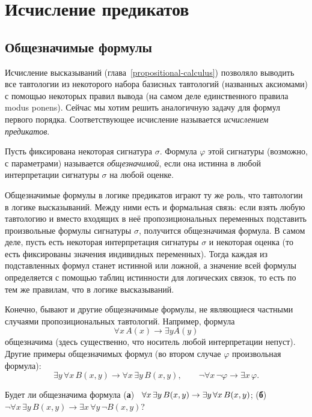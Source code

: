 \chapter{Исчисление предикатов}

\section{Общезначимые формулы}

Исчисление высказываний (глава~\ref{propositional-calculus})
позволяло выводить все тавтологии из некоторого набора базисных
тавтологий (названных аксиомами) с помощью некоторых правил
вывода (на самом деле единственного правила mo\-dus ponens).
Сейчас мы хотим решить аналогичную задачу для формул первого
порядка. Соответствующее исчисление называется
\emph{исчислением предикатов}.%

Пусть фиксирована некоторая сигнатура $\sigma$.
Формула $\varphi$ этой сигнатуры (возможно, с параметрами)
называется \emph{общезначимой},%
%
если она
истинна в любой интерпретации сигнатуры $\sigma$ на любой
оценке.

Общезначимые формулы в логике предикатов играют ту же роль, что
тавтологии в логике высказываний. Между ними есть и формальная
связь: если взять любую тавтологию и вместо входящих в неё
пропозициональных переменных подставить произвольные формулы
сигнатуры $\sigma$, получится общезначимая формула. В самом
деле, пусть есть некоторая интерпретация сигнатуры $\sigma$ и
некоторая оценка (то есть фиксированы значения индивидных
переменных). Тогда каждая из подставленных формул станет
истинной или ложной, а значение всей формулы определяется с
помощью таблиц истинности для логических связок, то есть по тем
же правилам, что в логике высказываний.

Конечно, бывают и другие общезначимые формулы, не являющиеся
частными случаями пропозициональных тавтологий. Например, формула\vspace{-1ex}
        $$\forall x\, A(x) \to \exists y A(y)$$
общезначима (здесь существенно, что носитель любой интерпретации
непуст). Другие примеры общезначимых формул (во втором случае $\varphi$\т
произвольная формула):
        $$
\exists y\, \forall x\, B(x,y)\to
\forall x\, \exists y\, B(x,y),\qquad
\lnot\forall x\,\lnot \varphi \to \exists x\, \varphi.
        $$

\begin{problem}
Будет ли общезначима формула
        (\textbf{а})~%
$\forall x\, \exists y\, B(x,y)\hm\to\exists y\,\forall x\,
B(x,y)$;
        (\textbf{б})~%
$\lnot\forall x\, \exists y\, B(x,y)\to\exists x\,\forall y\, \lnot B(x,y)$?
\end{problem}

